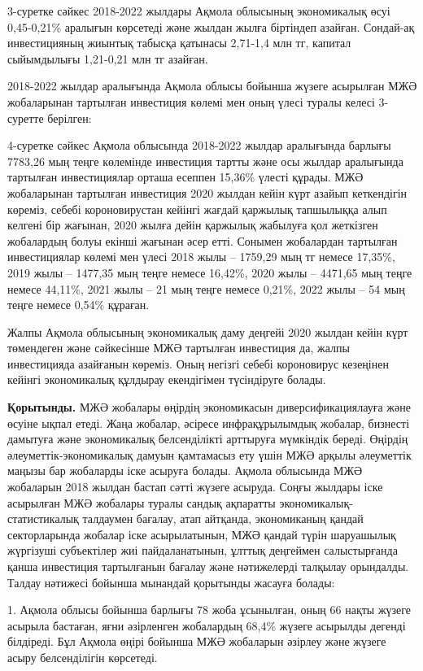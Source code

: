 \begin{multicols}{2}
3-суретке сәйкес 2018-2022 жылдары Ақмола облысының экономикалық өсуі
0,45-0,21\% аралығын көрсетеді және жылдан жылға біртіндеп азайған.
Сондай-ақ инвестицияның жиынтық табысқа қатынасы 2,71-1,4 млн тг,
капитал сыйымдылығы 1,21-0,21 млн тг азайған.

2018-2022 жылдар аралығында Ақмола облысы бойынша жүзеге асырылған МЖӘ
жобаларынан тартылған инвестиция көлемі мен оның үлесі туралы келесі
3-суретте берілген:

4-суретке сәйкес Ақмола облысында 2018-2022 жылдар аралығында барлығы
7783,26 мың теңге көлемінде инвестиция тартты және осы жылдар аралығында
тартылған инвестициялар орташа есеппен 15,36\% үлесті құрады. МЖӘ
жобаларынан тартылған инвестиция 2020 жылдан кейін күрт азайып
кеткендігін көреміз, себебі короновирустан кейінгі жағдай қаржылық
тапшылыққа алып келгені бір жағынан, 2020 жылға дейін қаржылық жабылуға
қол жеткізген жобалардың болуы екінші жағынан әсер етті. Сонымен
жобалардан тартылған инвестициялар көлемі мен үлесі 2018 жылы -- 1759,29
мың тг немесе 17,35\%, 2019 жылы -- 1477,35 мың теңге немесе 16,42\%,
2020 жылы -- 4471,65 мың теңге немесе 44,11\%, 2021 жылы -- 21 мың теңге
немесе 0,21\%, 2022 жылы -- 54 мың теңге немесе 0,54\% құраған.

Жалпы Ақмола облысының экономикалық даму деңгейі 2020 жылдан кейін күрт
төмендеген және сәйкесінше МЖӘ тартылған инвестиция да, жалпы
инвестицияда азайғанын көреміз. Оның негізгі себебі короновирус
кезеңінен кейінгі экономикалық құлдырау екендігімен түсіндіруге болады.

{\bfseries Қорытынды.} МЖӘ жобалары өңірдің экономикасын
диверсификациялауға және өсуіне ықпал етеді. Жаңа жобалар, әсіресе
инфрақұрылымдық жобалар, бизнесті дамытуға және экономикалық
белсенділікті арттыруға мүмкіндік береді. Өңірдің
әлеуметтік-экономикалық дамуын қамтамасыз ету үшін МЖӘ арқылы әлеуметтік
маңызы бар жобаларды іске асыруға болады. Ақмола облысында МЖӘ жобаларын
2018 жылдан бастап сәтті жүзеге асыруда. Соңғы жылдары іске асырылған
МЖӘ жобалары туралы сандық ақпаратты экономикалық-статистикалық
талдаумен бағалау, атап айтқанда, экономиканың қандай секторларында
жобалар іске асырылатынын, МЖӘ қандай түрін шаруашылық жүргізуші
субъектілер жиі пайдаланатынын, ұлттық деңгеймен салыстырғанда қанша
инвестиция тартылғанын бағалау және нәтижелерді талқылау орындалды.
Талдау нәтижесі бойынша мынандай қорытынды жасауға болады:

1. Ақмола облысы бойынша барлығы 78 жоба ұсынылған, оның 66 нақты жүзеге
асырыла бастаған, яғни әзірленген жобалардың 68,4\% жүзеге асырылды
дегенді білдіреді. Бұл Ақмола өңірі бойынша МЖӘ жобаларын әзірлеу және
жүзеге асыру белсенділігін көрсетеді.


\end{multicols}
